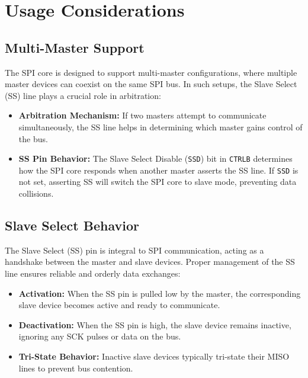 \documentclass{article}
\begin{document}
\section{Usage Considerations}

\subsection{Multi-Master Support}
The SPI core is designed to support multi-master configurations, where multiple master devices can coexist on the same SPI bus. In such setups, the Slave Select (SS) line plays a crucial role in arbitration:

\begin{itemize}
    \item \textbf{Arbitration Mechanism:} If two masters attempt to communicate simultaneously, the SS line helps in determining which master gains control of the bus.
    \item \textbf{SS Pin Behavior:} The Slave Select Disable (\texttt{SSD}) bit in \texttt{CTRLB} determines how the SPI core responds when another master asserts the SS line. If \texttt{SSD} is not set, asserting SS will switch the SPI core to slave mode, preventing data collisions.
\end{itemize}


\subsection{Slave Select Behavior}
The Slave Select (SS) pin is integral to SPI communication, acting as a handshake between the master and slave devices. Proper management of the SS line ensures reliable and orderly data exchanges:

\begin{itemize}
    \item \textbf{Activation:} When the SS pin is pulled low by the master, the corresponding slave device becomes active and ready to communicate.
    \item \textbf{Deactivation:} When the SS pin is high, the slave device remains inactive, ignoring any SCK pulses or data on the bus.
    \item \textbf{Tri-State Behavior:} Inactive slave devices typically tri-state their MISO lines to prevent bus contention.
\end{itemize}
\end{document}
